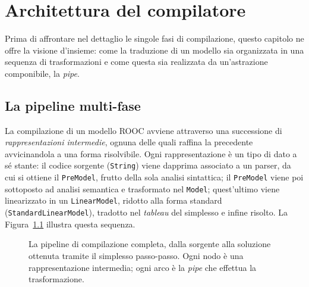 
\chapter{Architettura del compilatore}
\label{cap:architettura}

Prima di affrontare nel dettaglio le singole fasi di compilazione, questo
capitolo ne offre la visione d'insieme: come la traduzione di un modello sia
organizzata in una sequenza di trasformazioni e come questa sia realizzata da
un'astrazione componibile, la \emph{pipe}.

\section{La pipeline multi-fase}
\label{sec:pipeline}

La compilazione di un modello ROOC avviene attraverso
una successione di \emph{rappresentazioni intermedie}, ognuna delle quali
raffina la precedente avvicinandola a una forma risolvibile. Ogni
rappresentazione è un tipo di dato a sé stante: il codice sorgente
(\texttt{String}) viene dapprima associato a un parser, da cui si ottiene il
\texttt{PreModel}, frutto della sola analisi sintattica; il \texttt{PreModel}
viene poi sottoposto ad analisi semantica e trasformato nel \texttt{Model};
quest'ultimo viene linearizzato in un \texttt{LinearModel}, ridotto alla forma
standard (\texttt{StandardLinearModel}), tradotto nel \emph{tableau} del
simplesso e infine risolto. La Figura~\ref{fig:pipeline} illustra questa
sequenza.

\begin{figure}[ht]
\centering
{}
\caption{La pipeline di compilazione completa, dalla sorgente alla soluzione
ottenuta tramite il simplesso passo-passo. Ogni nodo è una rappresentazione
intermedia; ogni arco è la \emph{pipe} che effettua la trasformazione.}
\label{fig:pipeline}
\end{figure}


